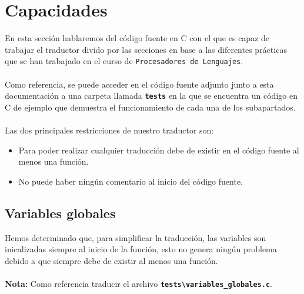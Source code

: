 \documentclass[]{article}
\begin{document}
        \section{Capacidades}
        En esta sección hablaremos del código fuente en C con el que es capaz de trabajar el traductor divido por las secciones en base a las diferentes prácticas que se han trabajado en el curso de \texttt{Procesadores de Lenguajes}. \\\\ Como referencia, se puede acceder en el código fuente adjunto junto a esta documentación a una carpeta llamada \texttt{\textbf{tests}} en la que se encuentra un código en C de ejemplo que demuestra el funcionamiento de cada una de los subapartados. \\\\ Las dos principales restricciones de nuestro traductor son: \\ \begin{itemize}
        \item Para poder realizar cualquier traducción debe de existir en el código fuente al menos una función.
        \item No puede haber ningún comentario al inicio del código fuente. \\
        \end{itemize}

        \subsection{Variables globales}
        Hemos determinado que, para simplificar la traducción, las variables son inicalizadas siempre al inicio de la función, esto no genera ningún problema debido a que siempre debe de existir al menos una función. \\\\ \textbf{Nota:} Como referencia traducir el archivo \texttt{\textbf{tests\textbackslash variables\_{globales.c}}}.
        
\end{document}
